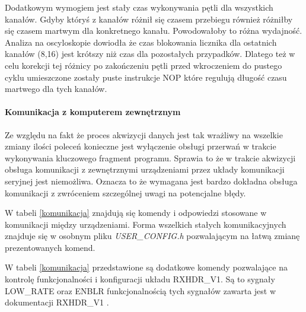 Dodatkowym wymogiem jest stały czas wykonywania pętli dla wszystkich kanałów. Gdyby któryś z kanałów różnił się czasem przebiegu również różniłby się czasem martwym dla konkretnego kanału. Powodowałoby to różna wydajność. 
Analiza na oscyloskopie dowiodła że czas blokowania licznika dla ostatnich kanałów (8,16) jest krótszy niż czas dla pozostałych przypadków. Dlatego też w celu korekcji tej różnicy po zakończeniu pętli przed wkroczeniem do pustego cyklu umieszczone zostały puste instrukcje NOP które regulują długość czasu martwego dla tych kanałów. 


\paragraph{Komunikacja z komputerem zewnętrznym}
Ze względu na fakt że proces akwizycji danych jest tak wrażliwy na wszelkie zmiany ilości poleceń konieczne jest wyłączenie obsługi przerwań w trakcie wykonywania kluczowego fragment programu. 
Sprawia to że w trakcie akwizycji obsługa komunikacji z zewnętrznymi urządzeniami przez układy komunikacji seryjnej jest niemożliwa. 
Oznacza to że wymagana jest bardzo dokładna obsługa komunikacji z zwróceniem szczególnej uwagi na potencjalne błędy. 

W tabeli \ref{komunikacja} znajdują się komendy i odpowiedzi stosowane w komunikacji między urządzeniami. 
Forma wszelkich stałych komunikacyjnych znajduje się w osobnym pliku \textit{USER\_CONFIG.h} pozwalającym na łatwą zmianę prezentowanych komend.

W tabeli \ref{komunikacja} przedstawione są dodatkowe komendy pozwalające na kontrolę funkcjonalności i konfiguracji układu RXHDR\_V1. Są to sygnały LOW\_RATE oraz ENBLR funkcjonalnością tych sygnałów zawarta jest w dokumentacji RXHDR\_V1 \cite{master}.

